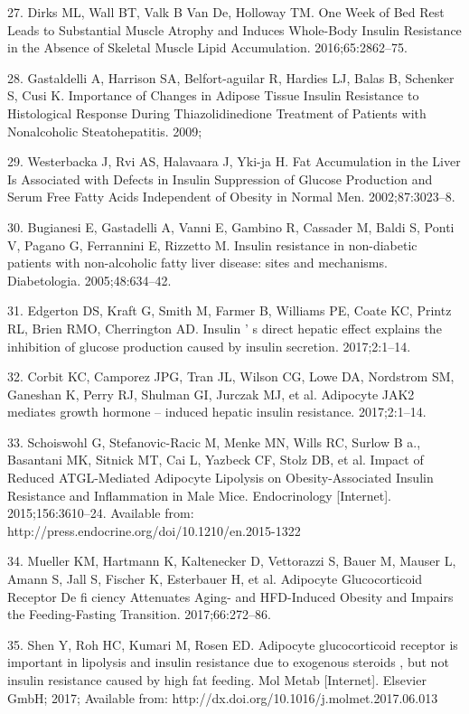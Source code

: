 \documentclass[11pt]{article} %
\begin{document}
27. Dirks ML, Wall BT, Valk B Van De, Holloway TM. One Week of Bed Rest
Leads to Substantial Muscle Atrophy and Induces Whole-Body Insulin
Resistance in the Absence of Skeletal Muscle Lipid Accumulation.
2016;65:2862--75.

28. Gastaldelli A, Harrison SA, Belfort-aguilar R, Hardies LJ, Balas B,
Schenker S, Cusi K. Importance of Changes in Adipose Tissue Insulin
Resistance to Histological Response During Thiazolidinedione Treatment
of Patients with Nonalcoholic Steatohepatitis. 2009;

29. Westerbacka J, Rvi AS, Halavaara J, Yki-ja H. Fat Accumulation in
the Liver Is Associated with Defects in Insulin Suppression of Glucose
Production and Serum Free Fatty Acids Independent of Obesity in Normal
Men. 2002;87:3023--8.

30. Bugianesi E, Gastadelli A, Vanni E, Gambino R, Cassader M, Baldi S,
Ponti V, Pagano G, Ferrannini E, Rizzetto M. Insulin resistance in
non-diabetic patients with non-alcoholic fatty liver disease: sites and
mechanisms. Diabetologia. 2005;48:634--42.

31. Edgerton DS, Kraft G, Smith M, Farmer B, Williams PE, Coate KC,
Printz RL, Brien RMO, Cherrington AD. Insulin ' s direct hepatic effect
explains the inhibition of glucose production caused by insulin
secretion. 2017;2:1--14.

32. Corbit KC, Camporez JPG, Tran JL, Wilson CG, Lowe DA, Nordstrom SM,
Ganeshan K, Perry RJ, Shulman GI, Jurczak MJ, et al. Adipocyte JAK2
mediates growth hormone -- induced hepatic insulin resistance.
2017;2:1--14.

33. Schoiswohl G, Stefanovic-Racic M, Menke MN, Wills RC, Surlow B a.,
Basantani MK, Sitnick MT, Cai L, Yazbeck CF, Stolz DB, et al. Impact of
Reduced ATGL-Mediated Adipocyte Lipolysis on Obesity-Associated Insulin
Resistance and Inflammation in Male Mice. Endocrinology {[}Internet{]}.
2015;156:3610--24. Available from:
http://press.endocrine.org/doi/10.1210/en.2015-1322

34. Mueller KM, Hartmann K, Kaltenecker D, Vettorazzi S, Bauer M, Mauser
L, Amann S, Jall S, Fischer K, Esterbauer H, et al. Adipocyte
Glucocorticoid Receptor De fi ciency Attenuates Aging- and HFD-Induced
Obesity and Impairs the Feeding-Fasting Transition. 2017;66:272--86.

35. Shen Y, Roh HC, Kumari M, Rosen ED. Adipocyte glucocorticoid
receptor is important in lipolysis and insulin resistance due to
exogenous steroids , but not insulin resistance caused by high fat
feeding. Mol Metab {[}Internet{]}. Elsevier GmbH; 2017; Available from:
http://dx.doi.org/10.1016/j.molmet.2017.06.013
\end{document}
